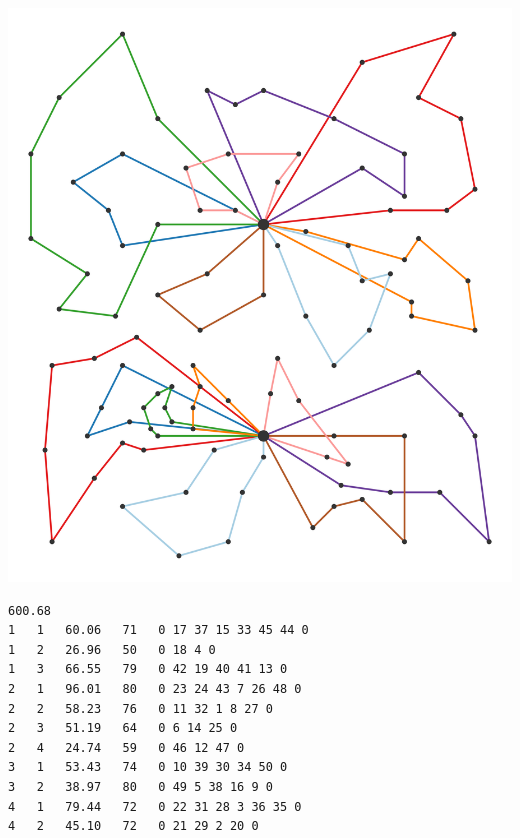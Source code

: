 \documentclass[paper=a4, fontsize=10pt]{scrartcl}
\begin{document}
\begin{multicols}{2}
{
\vspace{0.3cm}
\centering
\includegraphics[scale=0.01]{figures/solution.pdf}
\label{figure:flatland_baseline}
\vspace{0.3cm}
}

{
\footnotesize
\begin{verbatim}
600.68
1   1   60.06   71   0 17 37 15 33 45 44 0
1   2   26.96   50   0 18 4 0
1   3   66.55   79   0 42 19 40 41 13 0
2   1   96.01   80   0 23 24 43 7 26 48 0
2   2   58.23   76   0 11 32 1 8 27 0
2   3   51.19   64   0 6 14 25 0
2   4   24.74   59   0 46 12 47 0
3   1   53.43   74   0 10 39 30 34 50 0
3   2   38.97   80   0 49 5 38 16 9 0
4   1   79.44   72   0 22 31 28 3 36 35 0
4   2   45.10   72   0 21 29 2 20 0
\end{verbatim}
\vspace*{-3mm}
\label{fig:code_delta_reinforcement}
}




\end{multicols}
\end{document}
